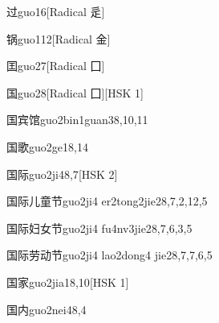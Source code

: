 \begin{entry}{过}{guo1}{6}[Radical 辵]
\end{entry}

\begin{entry}{锅}{guo1}{12}[Radical 金]
\end{entry}

\begin{entry}{囯}{guo2}{7}[Radical 囗]
\end{entry}

\begin{entry}{国}{guo2}{8}[Radical ⼞][HSK 1]
\end{entry}

\begin{entry}{国宾馆}{guo2bin1guan3}{8,10,11}
\end{entry}

\begin{entry}{国歌}{guo2ge1}{8,14}
\end{entry}

\begin{entry}{国际}{guo2ji4}{8,7}[HSK 2]
\end{entry}

\begin{entry}{国际儿童节}{guo2ji4 er2tong2jie2}{8,7,2,12,5}
\end{entry}

\begin{entry}{国际妇女节}{guo2ji4 fu4nv3jie2}{8,7,6,3,5}
\end{entry}

\begin{entry}{国际劳动节}{guo2ji4 lao2dong4 jie2}{8,7,7,6,5}
\end{entry}

\begin{entry}{国家}{guo2jia1}{8,10}[HSK 1]
\end{entry}

\begin{entry}{国内}{guo2nei4}{8,4}
\end{entry}

